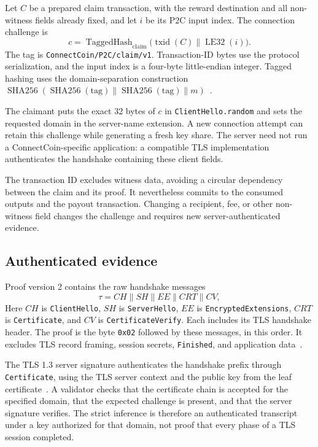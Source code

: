 \documentclass[11pt,a4paper]{article}
\newcommand{\SHA}{\operatorname{SHA256}}
\newcommand{\TagHash}{\operatorname{TaggedHash}}
\newcommand{\txid}{\operatorname{txid}}
\newcommand{\LE}{\operatorname{LE32}}
\newcommand{\concat}{\mathbin{\|}}
\begin{document}
Let $C$ be a prepared claim transaction, with the reward destination and all
non-witness fields already fixed, and let $i$ be its P2C input index. The
connection challenge is
\begin{equation}
  c=\TagHash_{\mathrm{claim}}\bigl(\txid(C)\concat\LE(i)\bigr).
  \label{eq:challenge}
\end{equation}
The tag is \texttt{ConnectCoin/P2C/claim/v1}. Transaction-ID bytes use the
protocol serialization, and the input index is a four-byte little-endian
integer. Tagged hashing uses the domain-separation construction
$\SHA(\SHA(\mathrm{tag})\concat\SHA(\mathrm{tag})\concat m)$~\cite{schnorr}.

The claimant puts the exact 32 bytes of $c$ in \texttt{ClientHello.random}
and sets the requested domain in the server-name extension. A new connection
attempt can retain this challenge while generating a fresh key share. The
server need not run a ConnectCoin-specific application: a compatible TLS
implementation authenticates the handshake containing these client fields.

The transaction ID excludes witness data, avoiding a circular dependency
between the claim and its proof. It nevertheless commits to the consumed
outputs and the payout transaction. Changing a recipient, fee, or other
non-witness field changes the challenge and requires new server-authenticated
evidence.

\subsection*{Authenticated evidence}

Proof version 2 contains the raw handshake messages
\begin{equation}
  \tau=CH\concat SH\concat EE\concat CRT\concat CV,
  \label{eq:transcript}
\end{equation}
Here $CH$ is \texttt{ClientHello}, $SH$ is \texttt{ServerHello},
$EE$ is \texttt{EncryptedExtensions}, $CRT$ is \texttt{Certificate},
and $CV$ is \texttt{CertificateVerify}. Each includes its TLS handshake header.
The proof is the byte \texttt{0x02} followed by these messages, in this order.
It excludes TLS record framing, session secrets, \texttt{Finished}, and
application data~\cite{connectcoin}.

The TLS 1.3 server signature authenticates the handshake prefix through
\texttt{Certificate}, using the TLS server context and the public key from
the leaf certificate~\cite{tls}. A validator checks that the certificate chain
is accepted for the specified domain, that the expected challenge is present,
and that the server signature verifies. The strict inference is therefore an
authenticated transcript under a key authorized for that domain, not proof
that every phase of a TLS session completed.
\end{document}
